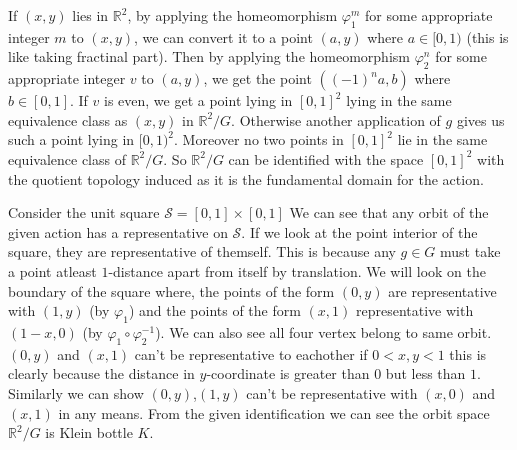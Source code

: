 \documentclass[11pt]{article}
\newcommand{\R}{\mathbb{R}}
\begin{document}
\vspace*{0.2cm}

\noindent If $(x, y)$ lies in $\mathbb{R}^2$, by applying the homeomorphism $\varphi_1^m$ for some appropriate integer $m$ to $(x, y)$, we can convert it to a point $(a, y)$ where $a \in[0,1)$ (this is like taking fractinal part). Then by applying the homeomorphism $\varphi_2^n$ for some appropriate integer $v$ to $(a, y)$, we get the point $\left((-1)^n a, b\right)$ where $b \in[0,1]$. If $v$ is even, we get a point lying in $[0,1]^2$ lying in the same equivalence class as $(x, y)$ in $\mathbb{R}^2 / G$. Otherwise another application of $g$ gives us such a point lying in $[0,1)^2$. Moreover no two points in $[0,1]^2$ lie in the same equivalence class of $\mathbb{R}^2 / G$. So $\mathbb{R}^2 / G$ can be identified with the space $[0,1]^2$ with the quotient topology induced as it is the fundamental domain for the action. 

\vspace*{0.2cm}

\noindent Consider the unit square $\mathcal{S} = [0,1]\times [0,1]$ We can see that any orbit of the given action has a representative on $\mathcal{S}$. If we look at the point interior of the square, they are representative of themself. This is because any $g \in G$ must take a point atleast $1$-distance apart from itself by translation. We will look on the boundary of the square where, the points of the form $(0,y)$ are representative with $(1,y)$ (by $\varphi_1$) and the points of the form $(x,1)$ representative with $(1-x,0)$ (by $\varphi_1 \circ \varphi_2^{-1}$). We can also see all four vertex belong to same orbit. $(0,y)$ and $(x,1)$ can't be representative to eachother if $0<x,y<1$ this is clearly because the distance in $y$-coordinate is greater than $0$ but less than $1$. Similarly we can show $(0,y)$,$(1,y)$ can't be representative with $(x,0)$ and $(x,1)$ in any means. From the given identification we can see the orbit space $\R^2 /G$ is Klein bottle $K$. 

\vspace*{0.2cm}
\end{document}
